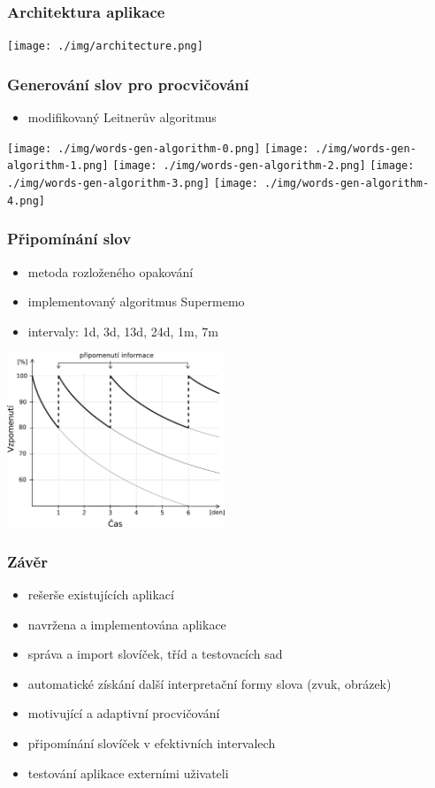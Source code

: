 \begin{frame}[t]
    \frametitle{Architektura aplikace}
    \texttt{[image: ./img/architecture.png]}
\end{frame}

\begin{frame}[t]
    \frametitle{Generování slov pro procvičování}
    \begin{itemize}
        \item modifikovaný Leitnerův algoritmus
    \end{itemize}
     {\texttt{[image: ./img/words-gen-algorithm-0.png]}}
     {\texttt{[image: ./img/words-gen-algorithm-1.png]}}
     {\texttt{[image: ./img/words-gen-algorithm-2.png]}}
     {\texttt{[image: ./img/words-gen-algorithm-3.png]}}
     {\texttt{[image: ./img/words-gen-algorithm-4.png]}}
\end{frame}

\begin{frame}[t]
    \frametitle{Připomínání slov}
    \begin{itemize}
        \item metoda rozloženého opakování
        \item implementovaný algoritmus Supermemo
        \item intervaly: 1d, 3d, 13d, 24d, 1m, 7m 
    \end{itemize}
    \begin{center}
        \includegraphics[width=6.5cm]{./img/forgetting-curve.pdf}\\
    \end{center}
\end{frame}

\begin{frame}[t]
    \frametitle{Závěr}
    \begin{itemize}[<+->]
        \item rešerše existujících aplikací 
        \item navržena a implementována aplikace
        \item správa a import slovíček, tříd a testovacích sad
        \item automatické získání další interpretační formy slova (zvuk, obrázek)
        \item motivující a adaptivní procvičování
        \item připomínání slovíček v efektivních intervalech
        \item testování aplikace externími uživateli
    \end{itemize}
\end{frame}


